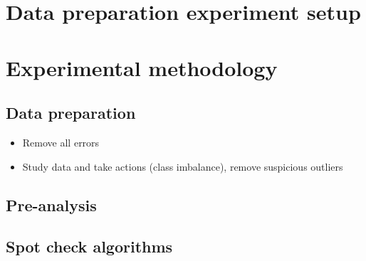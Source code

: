 \section{Data preparation experiment setup} \label{sec:exp_setups}
	


\section{Experimental methodology}
	\subsection{Data preparation}
	\begin{itemize}
		\item Remove all errors
		\item Study data and take actions (class imbalance), remove suspicious outliers 
	\end{itemize}
	\subsection{Pre-analysis}
		
	\subsection{Spot check algorithms}
		

